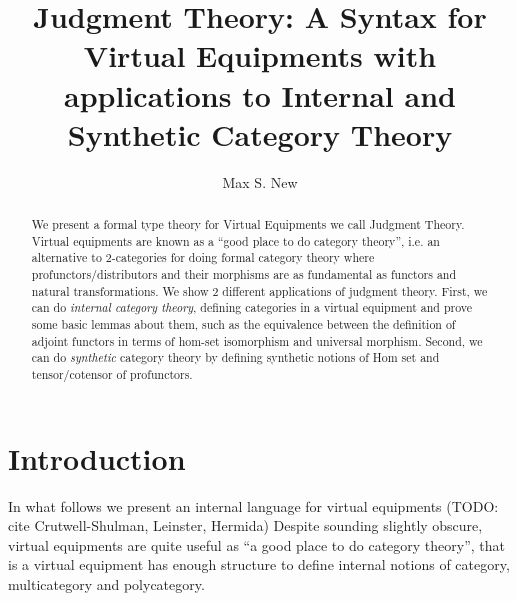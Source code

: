 \documentclass{article}
\begin{document}
\newtheorem{theorem}{Theorem}
\newtheorem{lemma}{Lemma}
\newtheorem{construction}{Construction}
\newtheorem{definition}{Definition}
\newcommand{\pto}{\nrightarrow}
\newcommand{\pfrom}{\nleftarrow}
\newcommand{\vcat}{\mathcal}
\newcommand{\cat}{\mathbbm}
\newcommand{\Set}{\textrm{Set}}
\newcommand{\vtkmnd}{\mathbb{K}\text{Mod} (\vcat{V},T)}
\newcommand{\rmod}{\text{RMod}}
\newcommand{\lmod}{\text{LMod}}

\newcommand{\id}{\textrm{id}}
\newcommand{\for}{\textrm{for}\,}
\newcommand{\when}{\textrm{when}\,}
\newcommand{\lett}{\textrm{let}\,}
\newcommand{\sort}{\,\,\textrm{sort}}
\newcommand{\ctx}{\,\,\textrm{context}}
\newcommand{\boundary}{\,\,\textrm{boundary}}
\newcommand{\prof}{\,\,\textrm{span}}
\newcommand{\subst}{\,\,\textrm{subst}}
\newcommand{\sigctx}{\,\,\textrm{sig-ctx}}
\newcommand{\sig}{\,\,\textrm{sig}}
\newcommand{\pipe}{\mathrel{|}}

\title{Judgment Theory: A Syntax for Virtual Equipments with applications to Internal and Synthetic Category Theory}
\author{Max S. New}

\maketitle

\begin{abstract}
  We present a formal type theory for Virtual Equipments we call
  Judgment Theory. Virtual equipments are known as a ``good place to
  do category theory'', i.e. an alternative to 2-categories for doing
  formal category theory where profunctors/distributors and their
  morphisms are as fundamental as functors and natural
  transformations. We show 2 different applications of judgment
  theory. First, we can do \emph{internal category theory}, defining
  categories in a virtual equipment and prove some basic lemmas about
  them, such as the equivalence between the definition of adjoint
  functors in terms of hom-set isomorphism and universal
  morphism. Second, we can do \emph{synthetic} category theory by
  defining synthetic notions of Hom set and tensor/cotensor of
  profunctors.
\end{abstract}

\section{Introduction}

In what follows we present an internal language for virtual equipments
(TODO: cite Crutwell-Shulman, Leinster, Hermida)
%
Despite sounding slightly obscure, virtual equipments are quite useful
as ``a good place to do category theory'', that is a virtual equipment
has enough structure to define internal notions of category,
multicategory and polycategory.
\end{document}
